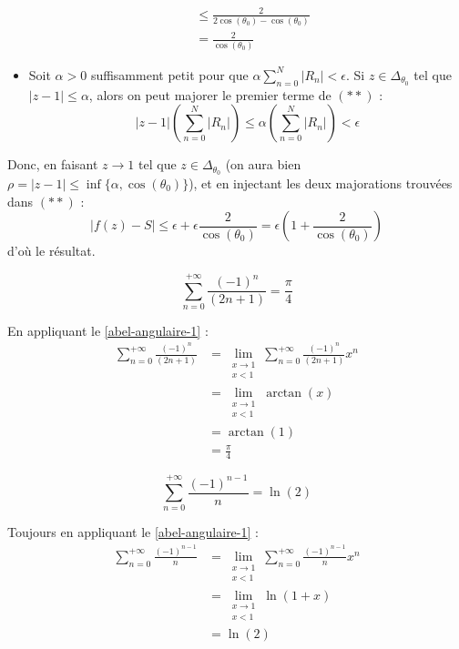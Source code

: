 \begin{demonstration}
\begin{itemize}
\begin{align*}
				&\leq \frac{2}{2\cos(\theta_0) - \cos(\theta_0)} \\
				&= \frac{2}{\cos(\theta_0)}
			\end{align*}
			\item Soit $\alpha > 0$ suffisamment petit pour que $\alpha \sum_{n=0}^N |R_n| < \epsilon$. Si $z \in \Delta_{\theta_0}$ tel que $|z-1| \leq \alpha$, alors on peut majorer le premier terme de $(**)$ :
			\[ |z-1| \left( \sum_{n=0}^N |R_n| \right) \leq \alpha \left( \sum_{n=0}^N |R_n| \right) < \epsilon \]
		\end{itemize}
		Donc, en faisant $z \longrightarrow 1$ tel que $z \in \Delta_{\theta_0}$ (on aura bien $\rho = |z-1| \leq \inf \{ \alpha, \cos(\theta_0) \}$), et en injectant les deux majorations trouvées dans $(**)$ :
		\[ |f(z)-S| \leq \epsilon + \epsilon \frac{2}{\cos(\theta_0)} = \epsilon \left(1 + \frac{2}{\cos(\theta_0)} \right) \]
		d'où le résultat.
	\end{demonstration}

	\begin{application}
		\[ \sum_{n=0}^{+\infty} \frac{(-1)^n}{(2n+1)} = \frac{\pi}{4} \]
	\end{application}

	\begin{demonstration}
		En appliquant le \cref{abel-angulaire-1} :
		\begin{align*}
			\sum_{n=0}^{+\infty} \frac{(-1)^n}{(2n+1)} &= \lim_{\substack{x \rightarrow 1 \\ x < 1}} \sum_{n=0}^{+\infty} \frac{(-1)^n}{(2n+1)} x^n \\
			&= \lim_{\substack{x \rightarrow 1 \\ x < 1}} \arctan(x) \\
			&= \arctan(1) \\
			&= \frac{\pi}{4}
		\end{align*}
	\end{demonstration}

	\begin{application}
		\[ \sum_{n=0}^{+\infty} \frac{(-1)^{n-1}}{n} = \ln(2) \]
	\end{application}

	\begin{demonstration}
		Toujours en appliquant le \cref{abel-angulaire-1} :
		\begin{align*}
			\sum_{n=0}^{+\infty} \frac{(-1)^{n-1}}{n} &= \lim_{\substack{x \rightarrow 1 \\ x < 1}} \sum_{n=0}^{+\infty} \frac{(-1)^{n-1}}{n} x^n \\
			&= \lim_{\substack{x \rightarrow 1 \\ x < 1}} \ln(1 + x) \\
			&= \ln(2)
		\end{align*}
	\end{demonstration}

